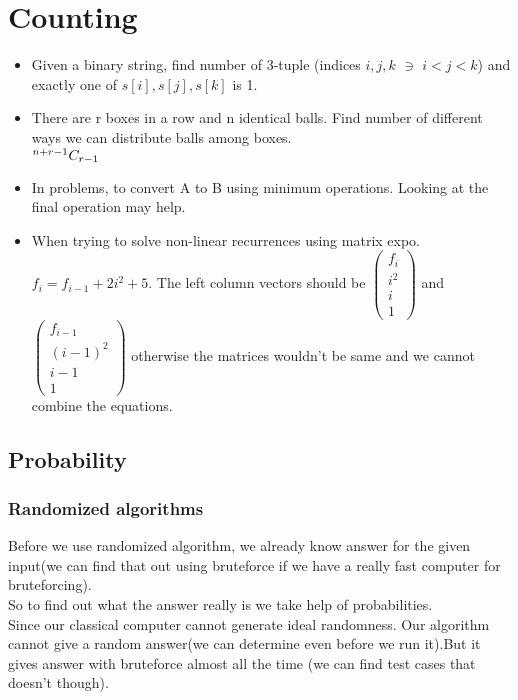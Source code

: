\documentclass[../Notes.tex]{subfiles}
\begin{document}
\chapter{Counting}

\begin{itemize}
	\item Given a binary string, find number of 3-tuple (indices $i,j,k$ $\ni$ $i<j<k$) and exactly one of $s[i],s[j],s[k]$ is 1. 
	\item There are r boxes in a row and n identical balls. Find number of different ways we can distribute balls among boxes.\\
	${}^{n+r-1}C_{r-1}$
	\item In problems, to convert A to B using minimum operations. Looking at the final operation may help.
	\item When trying to solve non-linear recurrences using matrix expo.
	$f_i = f_{i - 1} + 2i^2 + 5$. The left column vectors should be
	$\begin{pmatrix} f_i\\ i^2\\ i\\ 1\end{pmatrix}$ and $\begin{pmatrix} f_{i-1}\\ (i-1)^2\\ i-1\\ 1\end{pmatrix}$ otherwise the matrices wouldn't be same and we cannot combine the equations.
\end{itemize}
\section{Probability}
\subsection{Randomized algorithms}
Before we use randomized algorithm, we already know answer for the given input(we can find that out using bruteforce if we have a really fast computer for bruteforcing).\\
So to find out what the answer really is we take help of probabilities.\\
Since our classical computer cannot generate ideal randomness. Our algorithm cannot give a random answer(we can determine even before we run it).But it gives answer with bruteforce almost all the time (we can find test cases that doesn't though).
\end{document}
